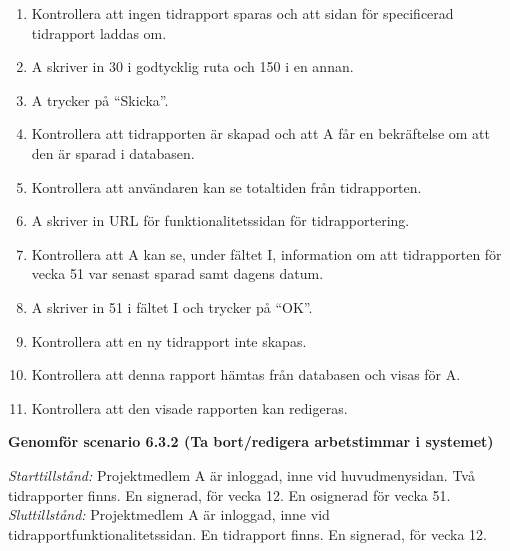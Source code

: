 \documentclass[a4paper]{article}
\begin{document}
\begin{ST}
\begin{enumerate}
\item Kontrollera att ingen tidrapport sparas och att sidan för specificerad tidrapport laddas om.
\item A skriver in 30 i godtycklig ruta och 150 i en annan.
\item A trycker på ``Skicka''.
\item Kontrollera att tidrapporten är skapad och att A får en bekräftelse om att den är sparad i databasen.
\item Kontrollera att användaren kan se totaltiden från tidrapporten.
\item A skriver in URL för funktionalitetssidan för tidrapportering.
\item Kontrollera att A kan se, under fältet I, information om att tidrapporten för vecka 51 var senast sparad samt dagens datum.
\item A skriver in 51 i fältet I och trycker på ``OK''.
\item Kontrollera att en ny tidrapport inte skapas.
\item Kontrollera att denna rapport hämtas från databasen och visas för A.
\item Kontrollera att den visade rapporten kan redigeras.

\end{enumerate}

\item
\textbf{Genomför scenario 6.3.2 (Ta bort/redigera arbetstimmar i systemet)}

\emph{Starttillstånd:} Projektmedlem A är inloggad, inne vid huvudmenysidan. Två tidrapporter finns. En signerad, för vecka 12. En osignerad för vecka 51.\\
\emph{Sluttillstånd:} Projektmedlem A är inloggad, inne vid tidrapportfunktionalitetssidan. En tidrapport finns. En signerad, för vecka 12.\\


\end{ST}
\end{document}
